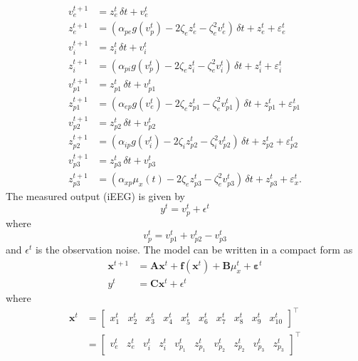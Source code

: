 \documentclass[]{article}
\begin{document}
\begin{align}
	v_e^{t+1} &= z_e^{t}\,\delta t + v_e^{t}\\
	z_e^{t+1} &= (\alpha_{pe}g\left(v_p^{t}\right) - 2\zeta_{e}z_e^{t} - \zeta_{e}^2v_e^{t})\,\delta t + z_e^{t} + \varepsilon_e^{t} \\
	v_i^{t+1} &= z_i^{t}\,\delta t + v_i^{t}\\
	z_i^{t+1} &= \left(\alpha_{pi}g\left(v_p^{t}\right) - 2\zeta_{e}z_i^{t} - \zeta_{e}^2v_i^{t}\right)\,\delta t + z_i^{t} + \varepsilon_i^{t}\\
	v_{p1}^{t+1} &= z_{p1}^{t}\,\delta t + v_{p1}^{t} \\
	z_{p1}^{t+1} &= (\alpha_{ep}g\left(v_e^{t}\right) - 2\zeta_{e}z_{p1}^{t}- \zeta_{e}^2v_{p1}^{t})\,\delta t + z_{p1}^{t} + \varepsilon_{p1}^{t}\\
	v_{p2}^{t+1} &= z_{p2}^{t}\,\delta t + v_{p2}^{t} \\
	z_{p2}^{t+1} &= (\alpha_{ip}g\left(v_i^{t}\right) - 2\zeta_{i}z_{p2}^{t} - \zeta_{i}^2v_{p2}^{t})\,\delta t + z_{p2}^{t} + \varepsilon_{p2}^{t} \\
	v_{p3}^{t+1} &= z_{p3}^{t}\,\delta t + v_{p3}^{t} \\
	z_{p3}^{t+1} &= (\alpha_{xp}\mu_x(t) - 2\zeta_{e}z_{p3}^{t} - \zeta_{e}^2v_{p3}^{t})\,\delta t + z_{p3}^{t} + \varepsilon_x^{t}.
\end{align}    
The measured output (iEEG) is given by
\begin{equation}
 y^{t}=v_p^{t}+\epsilon^{t}
\end{equation}
where
\begin{equation}
 v_p^{t}=v_{p1}^{t}+v_{p2}^{t}-v_{p3}^{t}  
	\end{equation}  
and $\epsilon^{t}$ is the observation noise.
The model can be written in a compact form as
\begin{align}
	\mathbf{x}^{t+1} &= \mathbf{A}\mathbf{x}^t + \mathbf{f}(\mathbf{x}^t)+\mathbf{B}\mu_x^t + \boldsymbol{\varepsilon}^t\\
	y^{t}&=\mathbf C\mathbf{x}^{t}+\epsilon^{t} 	
\end{align} 
where
 \begin{align}
	\mathbf{x}^t&=\begin{bmatrix} x_1^t&x_2^t&x_3^t&x_4^t&x_5^t&x_6^t&x_7^t&x_8^t&x_9^t&x_{10}^t\end{bmatrix}^{\top} \nonumber\\
	&=\begin{bmatrix} v_e^t&z_e^t&v_i^t&z_i^t&v_{p_1}^t&z_{p_1}^t&v_{p_2}^t&z_{p_2}^t&v_{p_3}^t&z_{p_3}^t\end{bmatrix}^{\top}
\end{align}
\end{document}
